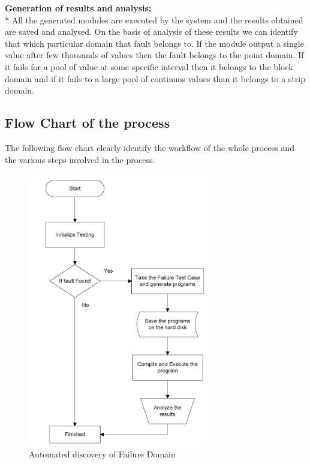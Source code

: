 \documentclass{acm_proc_article-sp}
\begin{document}
\noindent \textbf{Generation of results and analysis:}\\*
\indent All the generated modules are executed by the system and the results obtained are saved and analysed. On the basis of analysis of these results we can identify that which particular domain that fault belongs to. If the module output a single value after few thousands of values then the fault belongs to the point domain. If it fails for a pool of value at some specific interval then it belongs to the block domain and if it fails to a large pool of continuos values than it belongs to a strip domain.\\

\subsection{Flow Chart of the process}

The following flow chart clearly identify the workflow of the whole process and the various steps involved in the process.

\begin{figure}[htp]
\centering
\includegraphics[width=8cm,height=12cm]{automatedFail.png}
\caption{Automated discovery of Failure Domain}
\label{fig:autofail}
\end{figure}
\end{document}
